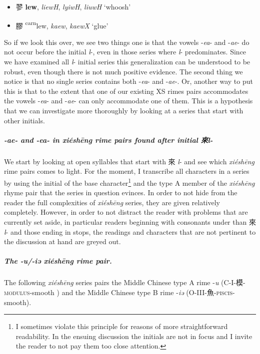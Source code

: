 \vspace{2mm}

\begin{itemize}
    \item {\Large{翏}}  %
    {\large{\textbf{lew}}},
    \textit{liewH}, \textit{lyiwH}, \textit{liuwH} `whoosh' %
    
\item {\Large{膠}}  %
    {\large{{\textsuperscript{carn}}lew}},
    \textit{kaew}, \textit{kaewX} `glue' %
\end{itemize}

So if we look this over, we see two things one is that the vowels -\textit{ea}- and -\textit{ae}- do not occur before the initial \textit{l}-, even in those series where \textit{l}- predominates. Since we have examined all \textit{l}- initial series this generalization can be understood to be robust, even though there is not much positive evidence. The second thing we notice is that no single series contains both -\textit{ea}- and -\textit{ae}-. Or, another way to put this is that to the extent that one of our existing XS rimes pairs accommodates the vowels -\textit{ea}- and -\textit{ae}- can only accommodate one of them. This is a hypothesis that we can investigate more thoroughly by looking at a series that start with other initials. 

\subparagraph{-ae- and -ea- in \textit{xiéshēng} rime pairs found after initial 來\textit{l}-}
We start by looking at open syllables that start with 來 \textit{l}- and see which \textit{xiéshēng} rime pairs comes to light. 
For the moment, I transcribe all characters in a series by using the initial of the base character\footnote{I sometimes violate this principle for reasons of more straightforward readability. In the ensuing discussion the initials are not in focus and I invite the reader to not pay them too close attention.} and the type A member of the \textit{xiéshēng} rhyme pair that the series in question evinces. 
In order to not hide from the reader the full complexities of \textit{xiéshēng} series, they are given relatively completely. However, in order to not distract the reader with problems that are currently set aside, in particular readers beginning with consonants under than 來 \textit{l}- and those ending in stops, the readings and characters that are not pertinent to the discussion at hand are greyed out. 



\subparagraph{The -\textit{u}/-\textit{iə} \textit{xiéshēng} rime pair.}
\label{subpar:u-iə-XS-pair}
The following \textit{xiéshēng} series pairs the Middle Chinese type A rime -\textit{u} (C-I-模-\textsc{modulus}-smooth ) and the Middle Chinese type B rime -\textit{iə} (O-III-魚-\textsc{piscis}-smooth). 


